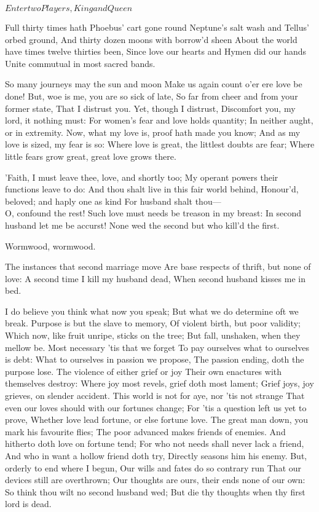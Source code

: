 \documentclass[11pt]{book}
\begin{document}
\Versus

	\(Enter two Players, King and Queen\)

  Full thirty times hath Phoebus' cart gone round
	Neptune's salt wash and Tellus' orbed ground,
	And thirty dozen moons with borrow'd sheen
	About the world have times twelve thirties been,
	Since love our hearts and Hymen did our hands
	Unite commutual in most sacred bands.

	   So many journeys may the sun and moon
	Make us again count o'er ere love be done!
	But, woe is me, you are so sick of late,
	So far from cheer and from your former state,
	That I distrust you. Yet, though I distrust,
	Discomfort you, my lord, it nothing must:
	For women's fear and love holds quantity;
	In neither aught, or in extremity.
	Now, what my love is, proof hath made you know;
	And as my love is sized, my fear is so:
	Where love is great, the littlest doubts are fear;
	Where little fears grow great, great love grows there.

	'Faith, I must leave thee, love, and shortly too;
	My operant powers their functions leave to do:
	And thou shalt live in this fair world behind,
	Honour'd, beloved; and haply one as kind
	For husband shalt thou--- \\

	O, confound the rest!
	Such love must needs be treason in my breast:
	In second husband let me be accurst!
	None wed the second but who kill'd the first.

\aparte\1  Wormwood, wormwood.

	   The instances that second marriage move
	Are base respects of thrift, but none of love:
	A second time I kill my husband dead,
	When second husband kisses me in bed.

	   I do believe you think what now you speak;
	But what we do determine oft we break.
	Purpose is but the slave to memory,
	Of violent birth, but poor validity;
	Which now, like fruit unripe, sticks on the tree;
	But fall, unshaken, when they mellow be.
	Most necessary 'tis that we forget
	To pay ourselves what to ourselves is debt:
	What to ourselves in passion we propose,
	The passion ending, doth the purpose lose.
	The violence of either grief or joy
	Their own enactures with themselves destroy:
	Where joy most revels, grief doth most lament;
	Grief joys, joy grieves, on slender accident.
	This world is not for aye, nor 'tis not strange
	That even our loves should with our fortunes change;
	For 'tis a question left us yet to prove,
	Whether love lead fortune, or else fortune love.
	The great man down, you mark his favourite flies;
	The poor advanced makes friends of enemies.
	And hitherto doth love on fortune tend;
	For who not needs shall never lack a friend,
	And who in want a hollow friend doth try,
	Directly seasons him his enemy.
	But, orderly to end where I begun,
	Our wills and fates do so contrary run
	That our devices still are overthrown;
	Our thoughts are ours, their ends none of our own:
	So think thou wilt no second husband wed;
	But die thy thoughts when thy first lord is dead.
\end{document}
